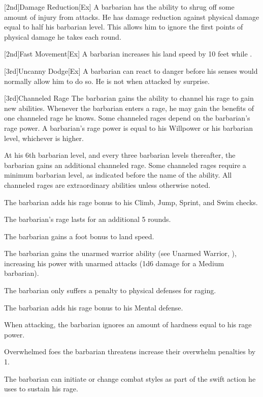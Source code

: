 [2nd]{Damage Reduction}[Ex]
A barbarian has the ability to shrug off some amount of injury from attacks.
He has damage reduction against physical damage equal to half his barbarian level.
This allows him to ignore the first points of physical damage he takes each round.

[2nd]{Fast Movement}[Ex]
A barbarian increases his land speed by 10 feet while \unencumbered.

[3rd]{Uncanny Dodge}[Ex]
A barbarian can react to danger before his senses would normally allow him to do so.
He is not \unaware when attacked by surprise.

[3rd]{Channeled Rage}
The barbarian gains the ability to channel his rage to gain new abilities.
Whenever the barbarian enters a rage, he may gain the benefits of one channeled rage he knows.
Some channeled rages depend on the barbarian's rage power.
A barbarian's rage power is equal to his Willpower or his barbarian level, whichever is higher.

At his 6th barbarian level, and every three barbarian levels thereafter, the barbarian gains an additional channeled rage.
Some channeled rages require a minimum barbarian level, as indicated before the name of the ability.
All channeled rages are extraordinary abilities unless otherwise noted.

The barbarian adds his rage bonus to his Climb, Jump, Sprint, and Swim checks.

The barbarian's rage lasts for an additional 5 rounds.

The barbarian gains a  foot bonus to land speed.

The barbarian gains the unarmed warrior ability (see Unarmed Warrior, ), increasing his power with unarmed attacks (1d6 damage for a Medium barbarian).

The barbarian only suffers a  penalty to physical defenses for raging.

The barbarian adds his rage bonus to his Mental defense.

When attacking, the barbarian ignores an amount of hardness equal to his rage power.

Overwhelmed foes the barbarian threatens increase their overwhelm penalties by 1.

The barbarian can initiate or change combat styles as part of the swift action he uses to sustain his rage.

